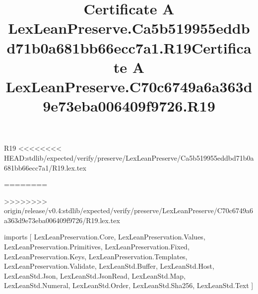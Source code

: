 \begin{lexlean}{R19}
<<<<<<<< HEAD:stdlib/expected/verify/preserve/LexLeanPreserve/Ca5b519955eddbd71b0a681bb66ecc7a1/R19.lex.tex
\title{Certificate A LexLeanPreserve.Ca5b519955eddbd71b0a681bb66ecc7a1.R19}
========
\title{Certificate A LexLeanPreserve.C70c6749a6a363d9e73eba006409f9726.R19}
>>>>>>>> origin/release/v0.4:stdlib/expected/verify/preserve/LexLeanPreserve/C70c6749a6a363d9e73eba006409f9726/R19.lex.tex
\begin{coremodule}
imports [
  LexLeanPreservation.Core,
  LexLeanPreservation.Values,
  LexLeanPreservation.Primitives,
  LexLeanPreservation.Fixed,
  LexLeanPreservation.Keys,
  LexLeanPreservation.Templates,
  LexLeanPreservation.Validate,
  LexLeanStd.Buffer,
  LexLeanStd.Host,
  LexLeanStd.Json,
  LexLeanStd.JsonRead,
  LexLeanStd.Map,
  LexLeanStd.Numeral,
  LexLeanStd.Order,
  LexLeanStd.Sha256,
  LexLeanStd.Text
]


\end{coremodule}
\end{lexlean}
